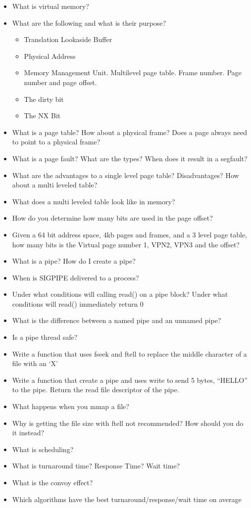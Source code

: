 \begin{itemize}
\tightlist
\item
  What is virtual memory?
\item
  What are the following and what is their purpose?

  \begin{itemize}
  \tightlist
  \item
    Translation Lookaside Buffer
  \item
    Physical Address
  \item
    Memory Management Unit. Multilevel page table. Frame number. Page
    number and page offset.
  \item
    The dirty bit
  \item
    The NX Bit
  \end{itemize}
\item
  What is a page table? How about a physical frame? Does a page always
  need to point to a physical frame?
\item
  What is a page fault? What are the types? When does it result in a
  segfault?
\item
  What are the advantages to a single level page table? Disadvantages?
  How about a multi leveled table?
\item
  What does a multi leveled table look like in memory?
\item
  How do you determine how many bits are used in the page offset?
\item
  Given a 64 bit address space, 4kb pages and frames, and a 3 level page
  table, how many bits is the Virtual page number 1, VPN2, VPN3 and the
  offset?
\item
  What is a pipe? How do I create a pipe?
\item
  When is SIGPIPE delivered to a process?
\item
  Under what conditions will calling read() on a pipe block? Under what
  conditions will read() immediately return 0
\item
  What is the difference between a named pipe and an unnamed pipe?
\item
  Is a pipe thread safe?
\item
  Write a function that uses fseek and ftell to replace the middle
  character of a file with an `X'
\item
  Write a function that create a pipe and uses write to send 5 bytes,
  ``HELLO'' to the pipe. Return the read file descriptor of the pipe.
\item
  What happens when you mmap a file?
\item
  Why is getting the file size with ftell not recommended? How should
  you do it instead?
\item
  What is scheduling?
\item
  What is turnaround time? Response Time? Wait time?
\item
  What is the convoy effect?
\item
  Which algorithms have the best turnaround/response/wait time on
  average
\end{itemize}
